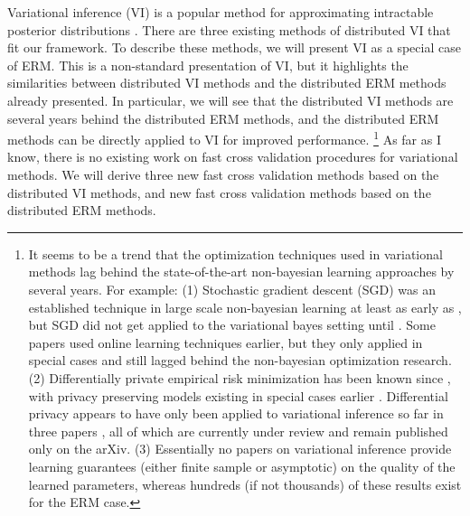 \documentclass[thesis.tex]{subfiles}
\begin{document}
Variational inference (VI) is a popular method for approximating intractable posterior distributions \citep{jordan1999introduction,blei2017variational}. 
There are three existing methods of distributed VI that fit our framework.
To describe these methods,
we will present VI as a special case of ERM.
This is a non-standard presentation of VI,
but it highlights the similarities between distributed VI methods and the distributed ERM methods already presented.
In particular, we will see that the distributed VI methods are several years behind the distributed ERM methods,
and the distributed ERM methods can be directly applied to VI for improved performance.%
\footnote{
    It seems to be a trend that the optimization techniques used in variational methods lag behind the state-of-the-art non-bayesian learning approaches by several years.
    For example:
    (1) Stochastic gradient descent (SGD) was an established technique in large scale non-bayesian learning at least as early as \citet{bottou2004large},
    but SGD did not get applied to the variational bayes setting until \citet{hoffman2013stochastic}.
    Some papers \citep[e.g.][]{canini2009online,hoffman2010online,wang2011online} used online learning techniques earlier,
    but they only applied in special cases and still lagged behind the non-bayesian optimization research.
    (2) Differentially private empirical risk minimization has been known since \citet{chaudhuri2011differentially}, with privacy preserving models existing in special cases earlier \citep{chaudhuri2009privacy}.
    Differential privacy appears to have only been applied to variational inference so far in three papers \citep{karwa2015private,park2016variational,jalko2016differentially},
    all of which are currently under review and remain published only on the arXiv.
    (3) Essentially no papers on variational inference provide learning guarantees (either finite sample or asymptotic) on the quality of the learned parameters,
    whereas hundreds (if not thousands) of these results exist for the ERM case.
}
As far as I know, there is no existing work on fast cross validation procedures for variational methods.
We will derive three new fast cross validation methods based on the distributed VI methods,
and \fixme{} new fast cross validation methods based on the distributed ERM methods.
\end{document}
